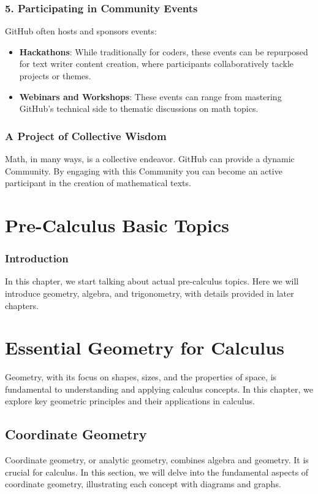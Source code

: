 \documentclass[a4paper,12pt]{book}
\begin{document}
\subsection*{5. Participating in Community Events}
GitHub often hosts and sponsors events:

\begin{itemize}
    \item \textbf{Hackathons}: While traditionally for coders, these events can be repurposed for text writer content creation, where participants collaboratively tackle projects or themes.
    \item \textbf{Webinars and Workshops}: These events can range from mastering GitHub's technical side to thematic discussions on math topics.
\end{itemize}

\subsection*{A Project of Collective Wisdom}
Math, in many ways, is a collective endeavor. GitHub can provide a dynamic Community. By engaging with this Community you can become an active participant in the creation of mathematical texts.

\chapter{Pre-Calculus Basic Topics}
\subsection*{Introduction}
In this chapter, we start talking about actual pre-calculus topics. Here we will introduce geometry, algebra, and trigonometry, with details provided in later chapters.

\chapter{Essential Geometry for Calculus}
\label{chap:geometry_for_calculus}


Geometry, with its focus on shapes, sizes, and the properties of space, is fundamental to understanding and applying calculus concepts. In this chapter, we explore key geometric principles and their applications in calculus.


\section{Coordinate Geometry}
\label{sec:coordinate_geometry}
Coordinate geometry, or analytic geometry, combines algebra and geometry. It is crucial for calculus. In this section, we will delve into the fundamental aspects of coordinate geometry, illustrating each concept with diagrams and graphs.
\end{document}
